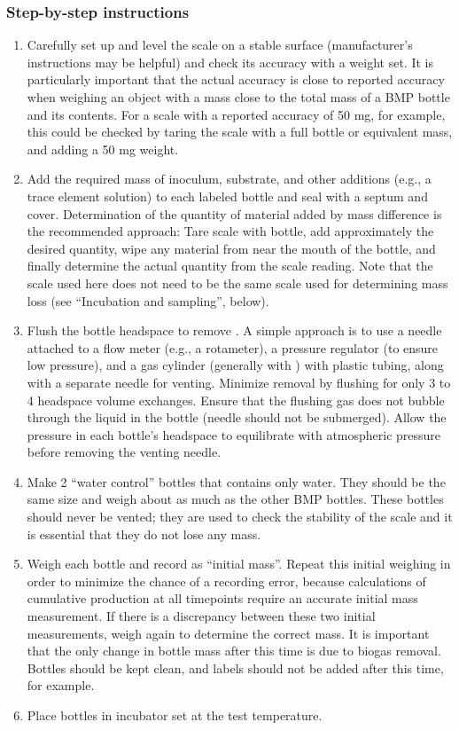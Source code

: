 \documentclass[]{article}
\begin{document}
\subsubsection{Step-by-step instructions}
\begin{enumerate}
  \item Carefully set up and level the scale on a stable surface (manufacturer's instructions may be helpful) and check its accuracy with a weight set. 
      It is particularly important that the actual accuracy is close to reported accuracy when weighing an object with a mass close to the total mass of a BMP bottle and its contents. 
      For a scale with a reported accuracy of 50 mg, for example, this could be checked by taring the scale with a full bottle or equivalent mass, and adding a 50 mg weight.
    \item Add the required mass of inoculum, substrate, and other additions (e.g., a trace element solution) to each labeled bottle and seal with a septum and cover. 
      Determination of the quantity of material added by mass difference is the recommended approach: Tare scale with bottle, add approximately the desired quantity, wipe any material from near the mouth of the bottle, and finally determine the actual quantity from the scale reading. 
      Note that the scale used here does not need to be the same scale used for determining mass loss (see ``Incubation and sampling'', below).
    \item Flush the bottle headspace to remove . 
      A simple approach is to use a needle attached to a flow meter (e.g., a rotameter), a pressure regulator (to ensure low pressure), and a gas cylinder (generally with ) with plastic tubing, along with a separate needle for venting. 
      Minimize  removal by flushing for only 3 to 4 headspace volume exchanges. 
      Ensure that the flushing gas does not bubble through the liquid in the bottle (needle should not be submerged). 
      Allow the pressure in each bottle’s headspace to equilibrate with atmospheric pressure before removing the venting needle.
    \item Make 2 ``water control'' bottles that contains only water. 
      They should be the same size and weigh about as much as the other BMP bottles. 
      These bottles should never be vented; they are used to check the stability of the scale and it is essential that they do not lose any mass.
    \item Weigh each bottle and record as ``initial mass''. 
      Repeat this initial weighing in order to minimize the chance of a recording error, because calculations of cumulative  production at all timepoints require an accurate initial mass measurement.
      If there is a discrepancy between these two initial measurements, weigh again to determine the correct mass.
      It is important that the only change in bottle mass after this time is due to biogas removal.
      Bottles should be kept clean, and labels should not be added after this time, for example.
    \item Place bottles in incubator set at the test temperature.
\end{enumerate}
\end{document}
